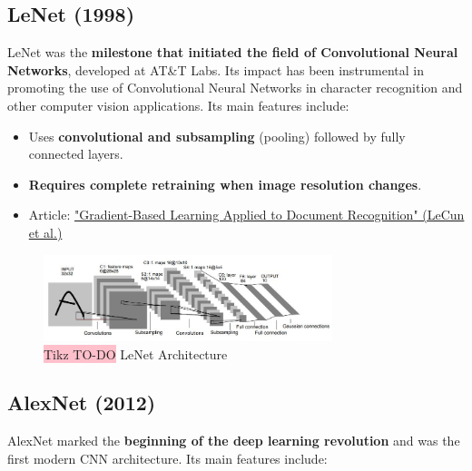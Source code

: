 \subsection{LeNet (1998)}
LeNet was the \textbf{milestone that initiated the field of Convolutional Neural Networks}, developed at AT\&T Labs. Its impact has been instrumental in promoting the use of Convolutional Neural Networks in character recognition and other computer vision applications. Its main features include:
\begin{itemize}
    \item Uses \textbf{convolutional and subsampling} (pooling) followed by fully connected layers.
    \item \textbf{Requires complete retraining when image resolution changes}.
    \item Article: \href{http://vision.stanford.edu/cs598_spring07/papers/Lecun98.pdf}{"Gradient-Based Learning Applied to Document Recognition" (LeCun et al.)}
\end{itemize}

\begin{figure}[!htbp]
    \centering
    \includegraphics[width=0.75\textwidth]{tikz/chapter5 - LeNet.jpeg}
    \caption{{\color{red}\colorbox{pink}{Tikz TO-DO}} LeNet Architecture}
\end{figure}

\subsection{AlexNet (2012)}
AlexNet marked the \textbf{beginning of the deep learning revolution} and was the first modern CNN architecture. Its main features include:

